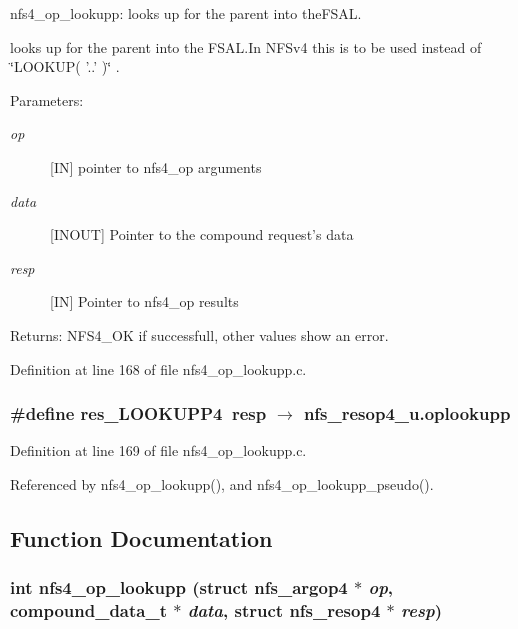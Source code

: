nfs4\_\-op\_\-lookupp: looks up for the parent into the\-FSAL.

looks up for the parent into the FSAL.In NFSv4 this is to be used instead of \char`\"{}LOOKUP( '..' )\char`\"{} .

\begin{Desc}
\item[Parameters:]
\begin{description}
\item[{\em op}][IN] pointer to nfs4\_\-op arguments \item[{\em data}][INOUT] Pointer to the compound request's data \item[{\em resp}][IN] Pointer to nfs4\_\-op results\end{description}
\end{Desc}
\begin{Desc}
\item[Returns:]NFS4\_\-OK if successfull, other values show an error. \end{Desc}


Definition at line 168 of file nfs4\_\-op\_\-lookupp.c.
\subsubsection{\setlength{\rightskip}{0pt plus 5cm}\#define res\_\-LOOKUPP4\ resp $\rightarrow$ nfs\_\-resop4\_\-u.oplookupp}\label{nfs4__op__lookupp_8c_a1}




Definition at line 169 of file nfs4\_\-op\_\-lookupp.c.

Referenced by nfs4\_\-op\_\-lookupp(), and nfs4\_\-op\_\-lookupp\_\-pseudo().

\subsection{Function Documentation}
\subsubsection{\setlength{\rightskip}{0pt plus 5cm}int nfs4\_\-op\_\-lookupp (struct nfs\_\-argop4 $\ast$ {\em op}, compound\_\-data\_\-t $\ast$ {\em data}, struct nfs\_\-resop4 $\ast$ {\em resp})}\label{nfs4__op__lookupp_8c_a2}





